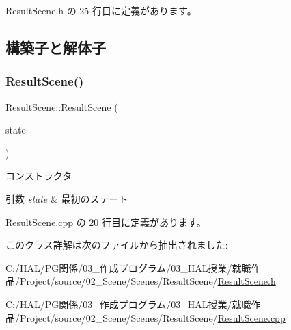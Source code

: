  Result\+Scene.\+h の 25 行目に定義があります。



\subsection{構築子と解体子}
\mbox{\label{class_result_scene_ac184d41a92125eda200a132fe7aadd2e}} 
\subsubsection{\texorpdfstring{Result\+Scene()}{ResultScene()}}
{\footnotesize\ttfamily Result\+Scene\+::\+Result\+Scene (\begin{DoxyParamCaption}\item[{\mbox{\hyperlink{class_scene_base_1_1_state_base}{State\+Base}} $\ast$}]{state }\end{DoxyParamCaption})}



コンストラクタ 


\begin{DoxyParams}{引数}
{\em state} & 最初のステート \\
\hline
\end{DoxyParams}


 Result\+Scene.\+cpp の 20 行目に定義があります。



このクラス詳解は次のファイルから抽出されました\+:\begin{DoxyCompactItemize}
\item 
C\+:/\+H\+A\+L/\+P\+G関係/03\+\_\+作成プログラム/03\+\_\+\+H\+A\+L授業/就職作品/\+Project/source/02\+\_\+\+Scene/\+Scenes/\+Result\+Scene/\mbox{\hyperlink{_result_scene_8h}{Result\+Scene.\+h}}\item 
C\+:/\+H\+A\+L/\+P\+G関係/03\+\_\+作成プログラム/03\+\_\+\+H\+A\+L授業/就職作品/\+Project/source/02\+\_\+\+Scene/\+Scenes/\+Result\+Scene/\mbox{\hyperlink{_result_scene_8cpp}{Result\+Scene.\+cpp}}\end{DoxyCompactItemize}
